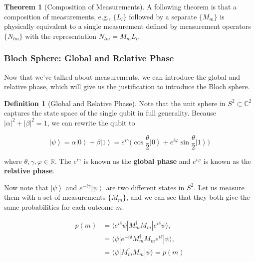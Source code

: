 \documentclass{article}
\newcommand{\ket}[1]{\ensuremath{\left|#1\right\rangle}}
\theoremstyle{definition}
\newtheorem{theorem}{Theorem}[section]
\newtheorem{definition}{Definition}[section]
\begin{document}
    \begin{theorem}[Composition of Measurements]
    A following theorem is that a composition of measurements, e.g., $\{L_l\}$ followed by a separate $\{M_m\}$ is physically equivalent to a single measurement defined by measurement operators $\{N_{lm}\}$ with the representation $N_{lm} = M_m L_l$.  
    \end{theorem}

    \subsubsection{Bloch Sphere: Global and Relative Phase}

      Now that we've talked about measurements, we can introduce the global and relative phase, which will give us the justification to introduce the Bloch sphere. 


      \begin{definition}[Global and Relative Phase]
        Note that the unit sphere in $S^2 \subset \mathbb{C}^2$ captures the state space of the single qubit in full generality. Because $|\alpha|^2 + |\beta|^2 = 1$, we can rewrite the qubit to 

        \begin{equation}
          \ket{\psi} = \alpha \ket{0} + \beta \ket{1} = e^{i \gamma} \bigg( \cos{\frac{\theta}{2}} \ket{0} + e^{i \varphi} \sin{\frac{\theta}{2}} \ket{1} \bigg) 
          \label{eq:global_phase}
        \end{equation}

        where $\theta, \gamma, \varphi \in \mathbb{R}$. The $e^{i \gamma}$ is known as the \textbf{global phase} and $e^{i \varphi}$ is known as the \textbf{relative phase}. 
      \end{definition}

      Now note that $\ket{\psi}$ and $e^{- i \gamma} \ket{\psi}$ are two different states in $S^2$. Let us measure them with a set of measurements $\{M_m\}$, and we can see that they both give the same probabilities for each outcome $m$. 
      
      \begin{align*}
        p(m) & = \langle e^{i \delta} \psi | M_m^\dagger M_m | e^{i \delta} \psi \rangle, \\
        & = \langle \psi | e^{-i \delta} M_m^\dagger M_m e^{i \delta} | \psi \rangle, \\
        & = \langle \psi | M_m^\dagger M_m | \psi \rangle = p(m)
      \end{align*}
\end{document}
